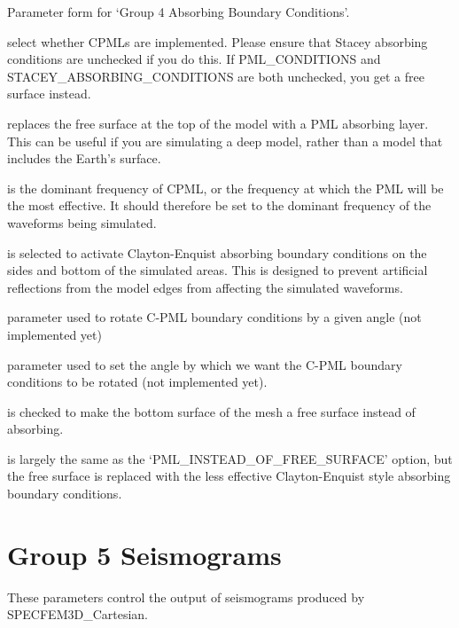\documentclass[english]{book}
\begin{document}

 Parameter form for ‘Group 4 \textendash{} Absorbing Boundary
Conditions’.

 select whether CPMLs are implemented. Please ensure
that Stacey absorbing conditions are unchecked if you do this. If
PML\_CONDITIONS and STACEY\_ABSORBING\_CONDITIONS are both unchecked,
you get a free surface instead.

 replaces the free surface at the top
of the model with a PML absorbing layer. This can be useful if you are
simulating a deep model, rather than a model that includes the Earth’s
surface.

 is the dominant frequency of CPML, or the frequency at
which the PML will be the most effective. It should therefore be set to
the dominant frequency of the waveforms being simulated.

 is selected to activate
Clayton-Enquist absorbing boundary conditions on the sides and bottom of
the simulated areas. This is designed to prevent artificial reflections
from the model edges from affecting the simulated waveforms.

 parameter used to rotate C-PML boundary
conditions by a given angle (not implemented yet)

 parameter used to set the angle by which we want
the C-PML boundary conditions to be rotated (not implemented yet).

 is checked to make the bottom surface of the
mesh a free surface instead of absorbing.

 is largely the same as the
‘PML\_INSTEAD\_OF\_FREE\_SURFACE’ option, but the free surface is
replaced with the less effective Clayton-Enquist style absorbing
boundary conditions.


\section{Group 5 \textendash{} Seismograms}
\label{\detokenize{Appendix1:a1-6-group-5-seismograms}}
These parameters control the output of seismograms produced by
SPECFEM3D\_Cartesian.

\end{document}
